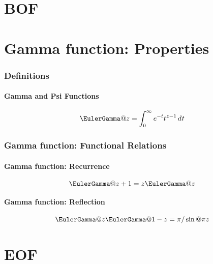 \documentclass{article}
\begin{document}
\part{BOF}

\part{Gamma function: Properties}\label{pt:GA.MATH}

\section{Definitions}\label{sec:GA.Def}

\subsection{Gamma and Psi Functions}\label{sec:GA.Def.GP}

\begin{equation}\label{eq:GA.Def.GP.1}
  \EulerGamma@{z} = \int_0^\infty \expe^{-t} t^{z-1} \diff{t}
\end{equation}

\section{Gamma function: Functional Relations}\label{sec:GA.FR}

\subsection{Gamma function: Recurrence}\label{sec:GA.FR.R}

\begin{equation}\label{eq:GA.FR.R.1}
  \EulerGamma@{z+1} = z \EulerGamma@{z}
\end{equation}

\subsection{Gamma function: Reflection}\label{sec:GA.FR.Rf}

\begin{equation}\label{eq:GA.FR.Rf.1}
  \EulerGamma@{z} \EulerGamma@{1-z}
    = \cpi / \sin@{\cpi z}
\end{equation}

\part{EOF}

%
%
\end{document}
